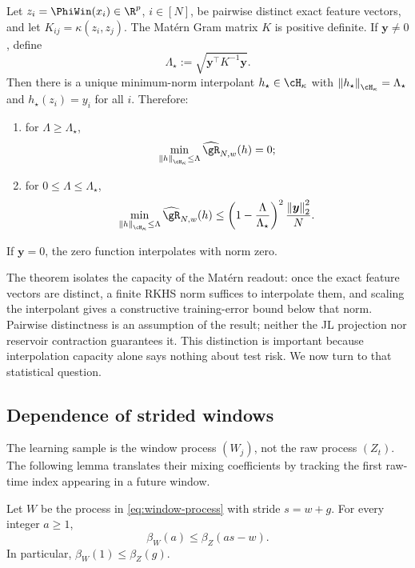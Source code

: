 \begin{theorem}
\label{thm:interpolation}
Let \(z_i=\PhiWin(x_i)\in\R^p\), \(i\in[N]\), be pairwise distinct exact
feature vectors, and let \(K_{ij}=\kappa(z_i,z_j)\). The Mat\'ern Gram matrix
\(K\) is positive definite. If \(\bm y\neq0\), define
\[
    \Lambda_\star
    :=
    \sqrt{\bm y^\top K^{-1}\bm y}.
\]
Then there is a unique minimum-norm interpolant
\(h_\star\in\cH_\kappa\) with
\(\norm{h_\star}_{\cH_\kappa}=\Lambda_\star\) and
\(h_\star(z_i)=y_i\) for all \(i\). Therefore:
\begin{enumerate}
    \item for \(\Lambda\geq\Lambda_\star\),
    \[
        \min_{\norm{h}_{\cH_\kappa}\leq\Lambda}
        \erisk_{N,w}(h)=0;
    \]
    \item for \(0\leq\Lambda\leq\Lambda_\star\),
    \begin{equation}
        \min_{\norm{h}_{\cH_\kappa}\leq\Lambda}
        \erisk_{N,w}(h)
        \leq
        \left(1-\frac{\Lambda}{\Lambda_\star}\right)^2
        \frac{\norm{\bm y}_2^2}{N}.
        \label{eq:conditional-interpolation}
    \end{equation}
\end{enumerate}
If \(\bm y=0\), the zero function interpolates with norm zero.
\end{theorem}

The theorem isolates the capacity of the Mat\'ern readout: once the exact
feature vectors are distinct, a finite RKHS norm suffices to interpolate them,
and scaling the interpolant gives a constructive training-error bound below
that norm. Pairwise distinctness is an assumption of the result; neither the JL
projection nor reservoir contraction guarantees it. This distinction is
important because interpolation capacity alone says nothing about test risk.
We now turn to that statistical question.

\subsection{Dependence of strided windows}

The learning sample is the window process \((W_j)\), not the raw process
\((Z_t)\). The following lemma translates their mixing coefficients by tracking
the first raw-time index appearing in a future window.

\begin{lemma}
\label{lem:window-mixing}
Let \(W\) be the process in \cref{eq:window-process} with stride \(s=w+g\).
For every integer \(a\geq1\),
\begin{equation}
    \beta_W(a)
    \leq
    \beta_Z(as-w).
    \label{eq:window-mixing}
\end{equation}
In particular, \(\beta_W(1)\leq\beta_Z(g)\).
\end{lemma}

